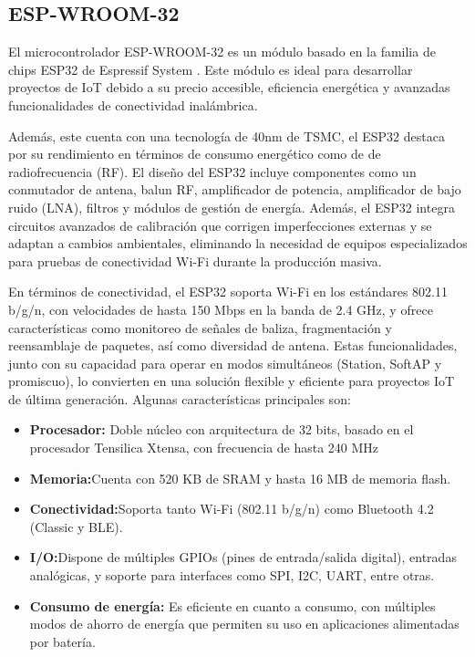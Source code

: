\documentclass[12pt,a4paper]{article}
\begin{document}
\subsection{ESP-WROOM-32}
El microcontrolador ESP-WROOM-32 es un módulo basado en la familia de chips ESP32 de Espressif System \cite{esp32}. Este módulo es ideal para desarrollar proyectos de IoT debido a su precio accesible, eficiencia energética y avanzadas funcionalidades de conectividad inalámbrica.

Además, este cuenta con una tecnología de 40nm de TSMC, el ESP32 destaca por su rendimiento en términos de consumo energético como de de radiofrecuencia (RF). El diseño del ESP32 incluye componentes como un conmutador de antena, balun RF, amplificador de potencia, amplificador de bajo ruido (LNA), filtros y módulos de gestión de energía. Además, el ESP32 integra circuitos avanzados de calibración que corrigen imperfecciones externas y se adaptan a cambios ambientales, eliminando la necesidad de equipos especializados para pruebas de conectividad Wi-Fi durante la producción masiva.

En términos de conectividad, el ESP32 soporta Wi-Fi en los estándares 802.11 b/g/n, con velocidades de hasta 150 Mbps en la banda de 2.4 GHz, y ofrece características como monitoreo de señales de baliza, fragmentación y reensamblaje de paquetes, así como diversidad de antena. Estas funcionalidades, junto con su capacidad para operar en modos simultáneos (Station, SoftAP y promiscuo), lo convierten en una solución flexible y eficiente para proyectos IoT de última generación. Algunas características principales son: 

\begin{itemize}
    \item \textbf{Procesador:} Doble núcleo con arquitectura de 32 bits, basado en el procesador Tensilica Xtensa, con frecuencia de hasta 240 MHz
    \item \textbf{Memoria:}Cuenta con 520 KB de SRAM y hasta 16 MB de memoria flash.
    \item \textbf{Conectividad:}Soporta tanto Wi-Fi (802.11 b/g/n) como Bluetooth 4.2 (Classic y BLE).
    \item \textbf{I/O:}Dispone de múltiples GPIOs (pines de entrada/salida digital), entradas analógicas, y soporte para interfaces como SPI, I2C, UART, entre otras.
    \item \textbf{Consumo de energía:} Es eficiente en cuanto a consumo, con múltiples modos de ahorro de energía que permiten su uso en aplicaciones alimentadas por batería.
\end{itemize}
\end{document}
